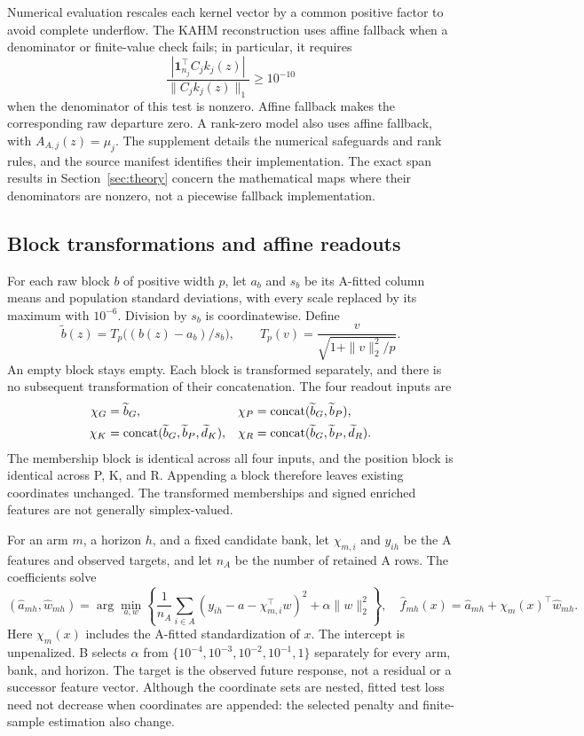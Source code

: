 Numerical evaluation rescales each kernel vector by a common positive factor to avoid complete underflow. The KAHM reconstruction uses affine fallback when a denominator or finite-value check fails; in particular, it requires
\[
 \frac{|\mathbf1_{n_j}^\top C_jk_j(z)|}{\|C_jk_j(z)\|_1}\geq10^{-10}
\]
when the denominator of this test is nonzero. Affine fallback makes the corresponding raw departure zero. A rank-zero model also uses affine fallback, with $A_{A,j}(z)=\mu_j$. The supplement details the numerical safeguards and rank rules, and the source manifest identifies their implementation. The exact span results in Section~\ref{sec:theory} concern the mathematical maps where their denominators are nonzero, not a piecewise fallback implementation.

\subsection{Block transformations and affine readouts}
For each raw block $b$ of positive width $p$, let $a_b$ and $s_b$ be its A-fitted column means and population standard deviations, with every scale replaced by its maximum with $10^{-6}$. Division by $s_b$ is coordinatewise. Define
\begin{equation}
 \widetilde b(z)=T_p\bigl((b(z)-a_b)/s_b\bigr),\qquad
 T_p(v)=\frac{v}{\sqrt{1+\|v\|_2^2/p}}.
 \label{eq:transform}
\end{equation}
An empty block stays empty. Each block is transformed separately, and there is no subsequent transformation of their concatenation. The four readout inputs are
\begin{align}
 \chi_G&=\widetilde b_G,&
 \chi_P&=\operatorname{concat}(\widetilde b_G,\widetilde b_P),\nonumber\\
 \chi_K&=\operatorname{concat}(\widetilde b_G,\widetilde b_P,\widetilde d_K),&
 \chi_R&=\operatorname{concat}(\widetilde b_G,\widetilde b_P,\widetilde d_R).
 \label{eq:arms}
\end{align}
The membership block is identical across all four inputs, and the position block is identical across P, K, and R. Appending a block therefore leaves existing coordinates unchanged. The transformed memberships and signed enriched features are not generally simplex-valued.

For an arm $m$, a horizon $h$, and a fixed candidate bank, let $\chi_{m,i}$ and $y_{ih}$ be the A features and observed targets, and let $n_A$ be the number of retained A rows. The coefficients solve
\begin{equation}
 (\widehat a_{mh},\widehat w_{mh})=
 \arg\min_{a,w}\left\{\frac1{n_A}\sum_{i\in A}(y_{ih}-a-\chi_{m,i}^\top w)^2+\alpha\|w\|_2^2\right\},
 \quad \widehat f_{mh}(x)=\widehat a_{mh}+\chi_m(x)^\top\widehat w_{mh}.
 \label{eq:ridge}
\end{equation}
Here $\chi_m(x)$ includes the A-fitted standardization of $x$. The intercept is unpenalized. B selects $\alpha$ from $\{10^{-4},10^{-3},10^{-2},10^{-1},1\}$ separately for every arm, bank, and horizon. The target is the observed future response, not a residual or a successor feature vector. Although the coordinate sets are nested, fitted test loss need not decrease when coordinates are appended: the selected penalty and finite-sample estimation also change.
